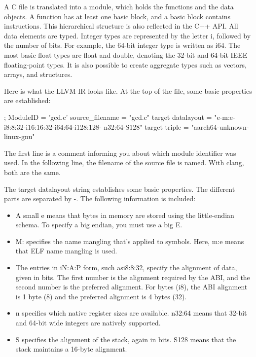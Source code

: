 A C file is translated into a module, which holds the functions and the data objects. A function has at least one basic block, and a basic block contains instructions. This hierarchical structure is also reflected in the C++ API. All data elements are typed. Integer types are represented by the letter i, followed by the number of bits. For example, the 64-bit integer type is written as i64. The most basic float types are float and double, denoting the 32-bit and 64-bit IEEE floating-point types. It is also possible to create aggregate types such as vectors, arrays, and structures.

Here is what the LLVM IR looks like. At the top of the file, some basic properties are established:

\begin{shell}
; ModuleID = 'gcd.c'
source_filename = "gcd.c"
target datalayout = "e-m:e-i8:8:32-i16:16:32-i64:64-i128:128-
n32:64-S128"
target triple = "aarch64-unknown-linux-gnu"
\end{shell}

The first line is a comment informing you about which module identifier was used. In the following line, the filename of the source file is named. With clang, both are the same.

The target datalayout string establishes some basic properties. The different parts are separated by -. The following information is included:

\begin{itemize}
\item
A small e means that bytes in memory are stored using the little-endian schema. To specify a big endian, you must use a big E.

\item
M: specifies the name mangling that’s applied to symbols. Here, m:e means that ELF name mangling is used.

\item
The entries in iN:A:P form, such asi8:8:32, specify the alignment of data, given in bits.
The first number is the alignment required by the ABI, and the second number is the preferred alignment. For bytes (i8), the ABI alignment is 1 byte (8) and the preferred alignment is 4 bytes (32).

\item
n specifies which native register sizes are available. n32:64 means that 32-bit and 64-bit wide integers are natively supported.

\item
S specifies the alignment of the stack, again in bits. S128 means that the stack maintains a 16-byte alignment.
\end{itemize}

